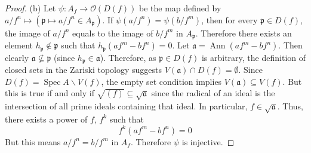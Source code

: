 \documentclass[12pt,letter]{article}
\newcommand{\Spec}[0]{\operatorname{Spec}}
\begin{document}
\begin{proof}
	(b) Let $\psi: A_f\to \mathscr O(D(f))$ be the map defined by $a/f^n\mapsto (\mathfrak p\mapsto a/f^n\in A_{\mathfrak p})$. If $\psi(a/f^n)=\psi(b/f^m)$, then for every $\mathfrak p\in D(f)$, the image of $a/f^n$ equals to the image of $b/f^m$ in $A_{\mathfrak p}$. Therefore there exists an element $h_{\mathfrak p}\notin \mathfrak p$ such that $h_{\mathfrak p}(af^m-bf^n)=0$. Let $\mathfrak a=\operatorname{Ann}(af^m-bf^n)$. Then clearly $\mathfrak a\not\subseteq \mathfrak p$ (since $h_{\mathfrak p}\in \mathfrak a$). Therefore, as $\mathfrak p\in D(f)$ is arbitrary, the definition of closed sets in the Zariski topology suggests $V(\mathfrak a)\cap D(f)=\emptyset$. Since $D(f)=\Spec A\backslash V(f)$, the empty set condition implies $V(\mathfrak a)\subseteq V(f)$. But this is true if and only if $\sqrt{(f)}\subseteq \sqrt{\mathfrak a}$ since the radical of an ideal is the intersection of all prime ideals containing that ideal. In particular, $f\in\sqrt{\mathfrak a}$. Thus, there exists a power of $f$, $f^k$ such that
	\[f^k(af^m-bf^n)=0\]
	But this means $a/f^n=b/f^m$ in $A_f$. Therefore $\psi$ is injective.
	

\end{proof}
\end{document}
